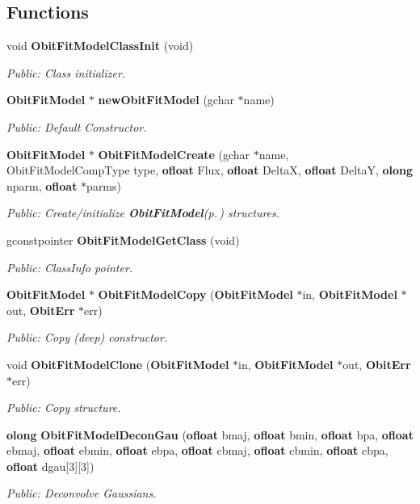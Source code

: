 \subsection*{Functions}
\begin{CompactItemize}
\item 
void {\bf Obit\-Fit\-Model\-Class\-Init} (void)
\begin{CompactList}\small\item\em Public: Class initializer. \item\end{CompactList}\item 
{\bf Obit\-Fit\-Model} $\ast$ {\bf new\-Obit\-Fit\-Model} (gchar $\ast$name)
\begin{CompactList}\small\item\em Public: Default Constructor. \item\end{CompactList}\item 
{\bf Obit\-Fit\-Model} $\ast$ {\bf Obit\-Fit\-Model\-Create} (gchar $\ast$name, Obit\-Fit\-Model\-Comp\-Type type, {\bf ofloat} Flux, {\bf ofloat} Delta\-X, {\bf ofloat} Delta\-Y, {\bf olong} nparm, {\bf ofloat} $\ast$parms)
\begin{CompactList}\small\item\em Public: Create/initialize {\bf Obit\-Fit\-Model}{\rm (p.\,\pageref{structObitFitModel})} structures. \item\end{CompactList}\item 
gconstpointer {\bf Obit\-Fit\-Model\-Get\-Class} (void)
\begin{CompactList}\small\item\em Public: Class\-Info pointer. \item\end{CompactList}\item 
{\bf Obit\-Fit\-Model} $\ast$ {\bf Obit\-Fit\-Model\-Copy} ({\bf Obit\-Fit\-Model} $\ast$in, {\bf Obit\-Fit\-Model} $\ast$out, {\bf Obit\-Err} $\ast$err)
\begin{CompactList}\small\item\em Public: Copy (deep) constructor. \item\end{CompactList}\item 
void {\bf Obit\-Fit\-Model\-Clone} ({\bf Obit\-Fit\-Model} $\ast$in, {\bf Obit\-Fit\-Model} $\ast$out, {\bf Obit\-Err} $\ast$err)
\begin{CompactList}\small\item\em Public: Copy structure. \item\end{CompactList}\item 
{\bf olong} {\bf Obit\-Fit\-Model\-Decon\-Gau} ({\bf ofloat} bmaj, {\bf ofloat} bmin, {\bf ofloat} bpa, {\bf ofloat} ebmaj, {\bf ofloat} ebmin, {\bf ofloat} ebpa, {\bf ofloat} cbmaj, {\bf ofloat} cbmin, {\bf ofloat} cbpa, {\bf ofloat} dgau[3][3])
\begin{CompactList}\small\item\em Public: Deconvolve Gaussians. \item\end{CompactList}\end{CompactItemize}

